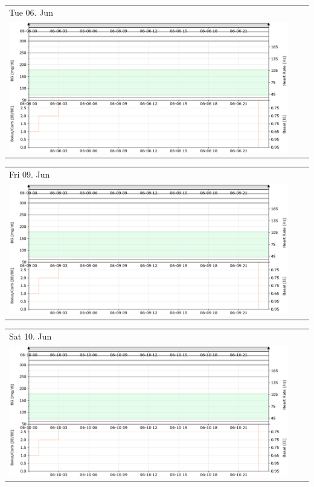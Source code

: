 \newpage

\begin{tabularx}{\linewidth}{YYY}
Tue 06. Jun\\
\includegraphics[scale=0.53,keepaspectratio,trim={0 0 0 0},clip]{plot_daily_170606.png}
\end{tabularx}

\begin{tabularx}{\linewidth}{YYY}
Fri 09. Jun\\
\includegraphics[scale=0.53,keepaspectratio,trim={0 0 0 0},clip]{plot_daily_170609.png}
\end{tabularx}

\begin{tabularx}{\linewidth}{YYY}
Sat 10. Jun\\
\includegraphics[scale=0.53,keepaspectratio,trim={0 0 0 0},clip]{plot_daily_170610.png}
\end{tabularx}

